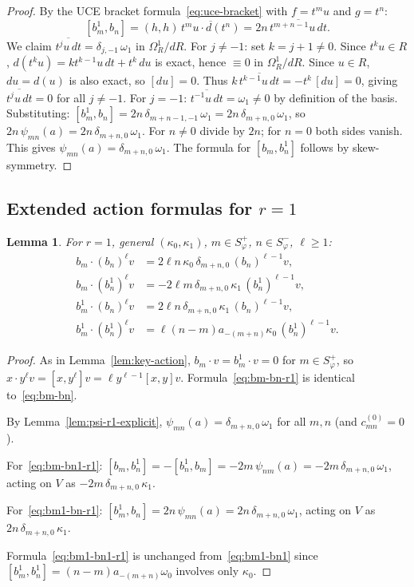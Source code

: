 \documentclass{amsart}
\newcommand{\ol}{\overline}
\newtheorem{lemma}[theorem]{Lemma}
\theoremstyle{definition}
\theoremstyle{remark}
\numberwithin{equation}{section}
\begin{document}
\begin{proof}
By the UCE bracket formula~\eqref{eq:uce-bracket} with
$f=t^mu$ and $g=t^n$:
\[
[b_m^1,b_n]
  = (h,h)\,\ol{t^mu\cdot d(t^n)}
  = 2n\,\ol{t^{m+n-1}u\,dt}.
\]
We claim $\ol{t^j u\,dt}=\delta_{j,-1}\,\omega_1$ in $\Omega_R^1/dR$.
For $j\neq-1$: set $k=j+1\neq0$.  Since $t^k u\in R$,
$d(t^k u)=kt^{k-1}u\,dt+t^k\,du$ is exact, hence $\equiv0$
in $\Omega_R^1/dR$.  Since $u\in R$, $du = d(u)$ is also exact,
so $[du]=0$.  Thus $k\,\ol{t^{k-1}u\,dt}=-t^k\,[du]=0$,
giving $\ol{t^j u\,dt}=0$ for all $j\neq-1$.
For $j=-1$: $\ol{t^{-1}u\,dt}=\omega_1\neq0$ by definition of the basis.
Substituting: $[b_m^1,b_n]=2n\,\delta_{m+n-1,-1}\,\omega_1=2n\,\delta_{m+n,0}\,\omega_1$,
so $2n\,\psi_{mn}(a)=2n\,\delta_{m+n,0}\,\omega_1$.
For $n\neq0$ divide by $2n$; for $n=0$ both sides vanish.  This gives
$\psi_{mn}(a)=\delta_{m+n,0}\,\omega_1$.  The formula for $[b_m,b_n^1]$
follows by skew-symmetry.
\end{proof}
\subsection{Extended action formulas for $r=1$}
\begin{lemma}\label{lem:key-action-r1}
For $r=1$, general $(\kappa_0,\kappa_1)$, $m\in S_\varphi^+$,
$n\in S_\varphi^-$, $\ell\ge1$:
\begin{align}
b_m\cdot(b_n)^\ell v
  &=2\ell n\,\kappa_0\,\delta_{m+n,0}\,(b_n)^{\ell-1}v,
  \label{eq:bm-bn-r1}\\
b_m\cdot(b_n^1)^\ell v
  &=-2\ell m\,\delta_{m+n,0}\,\kappa_1\,(b_n^1)^{\ell-1}v,
  \label{eq:bm-bn1-r1}\\
b_m^1\cdot(b_n)^\ell v
  &=2\ell n\,\delta_{m+n,0}\,\kappa_1\,(b_n)^{\ell-1}v,
  \label{eq:bm1-bn-r1}\\
b_m^1\cdot(b_n^1)^\ell v
  &=\ell(n-m)a_{-(m+n)}\kappa_0\,(b_n^1)^{\ell-1}v.
  \label{eq:bm1-bn1-r1}
\end{align}
\end{lemma}
\begin{proof}
As in Lemma~\ref{lem:key-action}, $b_m\cdot v=b_m^1\cdot v=0$ for
$m\in S_\varphi^+$, so $x\cdot y^\ell v=[x,y^\ell]v
=\ell y^{\ell-1}[x,y]v$.  Formula~\eqref{eq:bm-bn-r1} is
identical to~\eqref{eq:bm-bn}.

By Lemma~\ref{lem:psi-r1-explicit}, $\psi_{mn}(a)=\delta_{m+n,0}\,\omega_1$
for all $m,n$ (and $c_{mn}^{(0)}=0$).

For~\eqref{eq:bm-bn1-r1}:
$[b_m,b_n^1]=-[b_n^1,b_m]=-2m\,\psi_{nm}(a)=-2m\,\delta_{m+n,0}\,\omega_1$,
acting on $V$ as $-2m\,\delta_{m+n,0}\,\kappa_1$.

For~\eqref{eq:bm1-bn-r1}:
$[b_m^1,b_n]=2n\,\psi_{mn}(a)=2n\,\delta_{m+n,0}\,\omega_1$,
acting on $V$ as $2n\,\delta_{m+n,0}\,\kappa_1$.

Formula~\eqref{eq:bm1-bn1-r1} is unchanged from~\eqref{eq:bm1-bn1} since
$[b_m^1,b_n^1]=(n-m)a_{-(m+n)}\omega_0$ involves only $\kappa_0$.
\end{proof}
\end{document}
